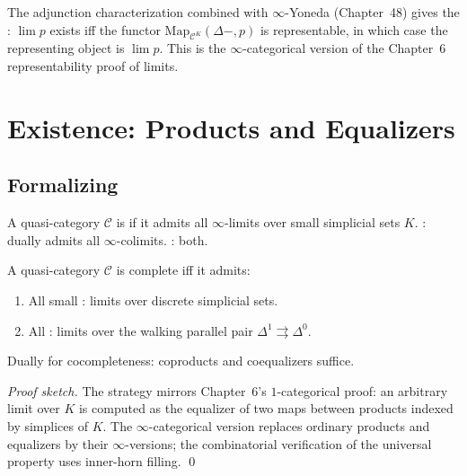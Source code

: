 \begin{remark}
The adjunction characterization combined with $\infty$-Yoneda
(Chapter~48) gives the :
$\lim p$ exists iff the functor $\mathrm{Map}_{\mathcal{C}^K}(\Delta -, p)$
is representable, in which case the representing object is $\lim p$.
This is the $\infty$-categorical version of the Chapter~6
representability proof of limits.
\end{remark}


\section{Existence: Products and Equalizers}
\label{sec:limits-existence}

\subsection{Formalizing}

\begin{definition}
\label{def:complete-qcat}
A quasi-category $\mathcal{C}$ is  if it admits all
$\infty$-limits over small simplicial sets $K$. : dually
admits all $\infty$-colimits. : both.
\end{definition}

\begin{theorem}
\label{thm:limit-products-equalizers}
A quasi-category $\mathcal{C}$ is complete iff it admits:
\begin{enumerate}
  \item All small : limits over discrete
        simplicial sets.
  \item All : limits over the walking parallel
        pair $\Delta^1 \rightrightarrows \Delta^0$.
\end{enumerate}
Dually for cocompleteness: coproducts and coequalizers suffice.
\end{theorem}

\begin{proof}[Proof sketch]
The strategy mirrors Chapter~6's $1$-categorical proof: an arbitrary
limit over $K$ is computed as the equalizer of two maps between products
indexed by simplices of $K$. The $\infty$-categorical version replaces
ordinary products and equalizers by their $\infty$-versions; the
combinatorial verification of the universal property uses inner-horn
filling.
\qed
\end{proof}

